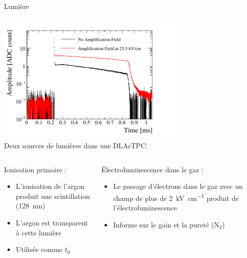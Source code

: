     \begin{frame}{Lumière}
        \begin{scriptsize}
            \centering \includegraphics[width=0.7\textwidth]{./pictures/scintillation.pdf}\\\vfill
            \centering Deux sources de lumières dans une DLArTPC:
            \begin{columns}
                \begin{column}{0.5\textwidth}
                    Ionisation primaire :
                    \begin{itemize}
                        \item L'ionisation de l'argon produit une scintillation (\SI{128}{\nano\meter})
                        \item L'argon est transparent à cette lumière
                        \item Utilisée comme $t_0$
                    \end{itemize}
                \end{column}
                \begin{column}{0.5\textwidth}
                    Électroluminescence dans le gaz :
                    \begin{itemize}
                        \item Le passage d'électrons dans le gaz avec un champ de plus de \SI{2}{\kilo\volt\per\centi\meter} produit de l'électroluminescence
                        \item Informe sur le gain et la pureté (N$_2$)
                    \end{itemize}
                \end{column}
            \end{columns}
        \end{scriptsize}
    \end{frame}

